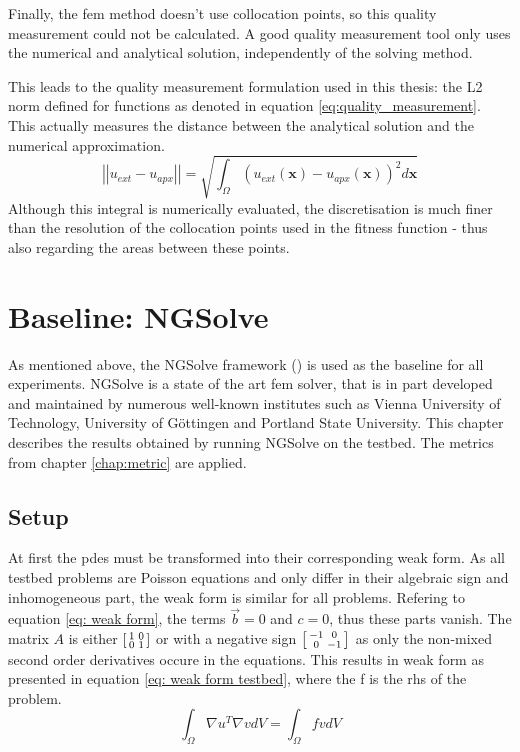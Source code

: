 \documentclass[./\jobname.tex]{subfiles}
\begin{document}
Finally, the \gls{fem} method doesn't use collocation points, so this quality measurement could not be calculated. A good quality measurement tool only uses the numerical and analytical solution, independently of the solving method. 

This leads to the quality measurement formulation used in this thesis: the L2 norm defined for functions as denoted in equation \ref{eq:quality_measurement}. This actually measures the distance between the analytical solution and the numerical approximation.  
\begin{equation}
\label{eq:quality_measurement}
\left|\left|u_{ext} - u_{apx}\right|\right| = \sqrt{\int_{\Omega} (u_{ext}(\mathbf{x}) - u_{apx}(\mathbf{x}))^2 d\mathbf{x}}
\end{equation}
Although this integral is numerically evaluated, the discretisation is much finer than the resolution of the collocation points used in the fitness function - thus also regarding the areas between these points.



\section{Baseline: NGSolve}
\label{chap:fem_baseline_results}
As mentioned above, the NGSolve framework (\cite{schoberl_ngsolvengsolve_2020}) is used as the baseline for all experiments. NGSolve is a state of the art \gls{fem} solver, that is in part developed and maintained by numerous well-known institutes such as Vienna University of Technology, University of Göttingen and Portland State University. This chapter describes the results obtained by running NGSolve on the testbed. The metrics from chapter \ref{chap:metric} are applied. 

\subsection{Setup}
At first the \gls{pde}s must be transformed into their corresponding weak form. As all testbed problems are Poisson equations and only differ in their algebraic sign and inhomogeneous part, the weak form is similar for all problems. Refering to equation \ref{eq: weak form}, the terms $\vec{b} = 0$ and $c = 0$, thus these parts vanish. The matrix $A$ is either $\begin{bsmallmatrix} 1 & 0 \\ 0 & 1 \end{bsmallmatrix}$ or with a negative sign $\begin{bsmallmatrix} -1 & 0 \\ 0 & -1 \end{bsmallmatrix}$ as only the non-mixed second order derivatives occure in the equations. This results in weak form as presented in equation \ref{eq: weak form testbed}, where the f is the \gls{rhs} of the problem.
\begin{equation}
\label{eq: weak form testbed}
\int_{\Omega} \nabla u^T \nabla v dV = \int_{\Omega} f v dV
\end{equation}
\end{document}
